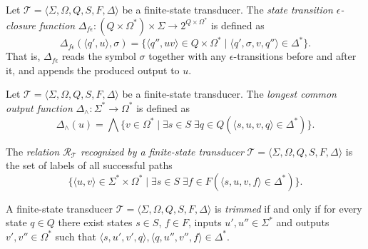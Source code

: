 \begin{definition}
  Let $\mathcal{T} = \langle \Sigma, \Omega, Q, S, F, \Delta \rangle$ be a
  finite-state transducer. The \emph{state transition $\epsilon$-closure function}
  $\Delta_{f\epsilon} : (Q \times \Omega^*) \times \Sigma \rightarrow 2^{Q \times
  \Omega^*}$ is defined as
  \begin{equation*}
    \Delta_{f\epsilon}(\langle q', u \rangle, \sigma) = \{ \langle q'', uv \rangle \in
    Q \times \Omega^* \mid \langle q', \sigma, v, q'' \rangle \in \Delta^* \}.
  \end{equation*}
  That is, $\Delta_{f\epsilon}$ reads the symbol $\sigma$ together with any
  $\epsilon$-transitions before and after it, and appends the produced output to $u$.
\end{definition}

\begin{definition}
  Let $\mathcal{T} = \langle \Sigma, \Omega, Q, S, F, \Delta \rangle$ be a
  finite-state transducer. The \emph{longest common output function} $\Delta_\wedge
  : \Sigma^* \rightarrow \Omega^*$ is defined as
  \begin{equation*}
    \Delta_\wedge(u) = \bigwedge{\{ v \in \Omega^* \mid \exists s \in S \; \exists q
    \in Q (\langle s, u, v, q \rangle \in \Delta^*) \}}.
  \end{equation*}
\end{definition}

\begin{definition}
  The \emph{relation $\mathcal{R}_\mathcal{T}$ recognized by a finite-state
  transducer} $\mathcal{T} = \langle \Sigma, \Omega, Q, S, F, \Delta \rangle$ is the
  set of labels of all successful paths
  \begin{equation*}
    \{ \langle u, v \rangle \in \Sigma^* \times \Omega^* \mid \exists s \in S \;
    \exists f \in F (\langle s, u, v, f \rangle \in \Delta^*) \}.
  \end{equation*}
\end{definition}

\begin{definition}
  A finite-state transducer $\mathcal{T} = \langle \Sigma, \Omega, Q, S, F, \Delta
  \rangle$ is \emph{trimmed} if and only if for every state $q \in Q$ there exist
  states $s \in S$, $f \in F$, inputs $u', u'' \in \Sigma^*$ and outputs $v', v'' \in
  \Omega^*$ such that $\langle s, u', v', q \rangle, \langle q, u'', v'', f \rangle
  \in \Delta^*$.
\end{definition}

